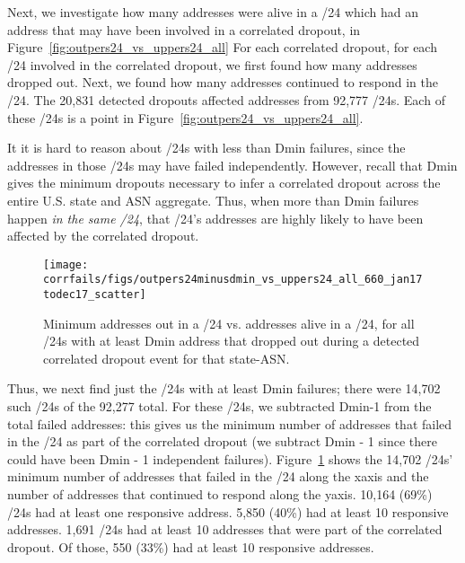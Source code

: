 Next, we investigate how many addresses were alive in a /24 which had
an address that may have been involved in a correlated dropout, in Figure~\ref{fig:outpers24_vs_uppers24_all}
For each correlated dropout, for each /24 involved in the correlated
dropout, we first found how many addresses dropped out. Next, we found
how many addresses continued to respond in the /24. The 20,831
detected dropouts affected addresses from 92,777 /24s. Each of these /24s
is a point in Figure~\ref{fig:outpers24_vs_uppers24_all}.

It it is hard to reason about /24s with less than Dmin failures, since
the addresses in those /24s may have failed independently. However,
recall that Dmin gives the minimum dropouts necessary to infer a
correlated dropout across the entire U.S. state and ASN
aggregate. Thus, when more than Dmin failures happen \emph{in the same
  /24}, that /24's addresses are highly likely to have been affected
by the correlated dropout. 

\begin{figure}[t]
\centering
\texttt{[image: corrfails/figs/outpers24minusdmin\_vs\_uppers24\_all\_660\_jan17todec17\_scatter]}
\caption{
\label{fig:outpers24minusdmin_vs_uppers24_all}
Minimum addresses out in a /24 vs. addresses alive in a /24, for all /24s with
at least Dmin address that dropped out during a detected correlated
dropout event for that state-ASN.}
\end{figure}

 Thus, we next find just the /24s with at least Dmin failures; there
were 14,702 such /24s of the 92,277 total. For these /24s, we
subtracted Dmin-1 from the total failed addresses: this gives us the
minimum number of addresses that failed in the /24 as part of the
correlated dropout (we subtract Dmin - 1 since there could have been
Dmin - 1 independent
failures). Figure~\ref{fig:outpers24minusdmin_vs_uppers24_all} shows
the 14,702 /24s' minimum number of addresses that failed in the /24
along the xaxis and the number of addresses that continued to respond
along the yaxis. 10,164 (69\%) /24s had at least one responsive
address. 5,850 (40\%) had at least 10 responsive addresses. 1,691 /24s
had at least 10 addresses that were part of the correlated dropout. Of
those, 550 (33\%) had at least 10 responsive addresses.





